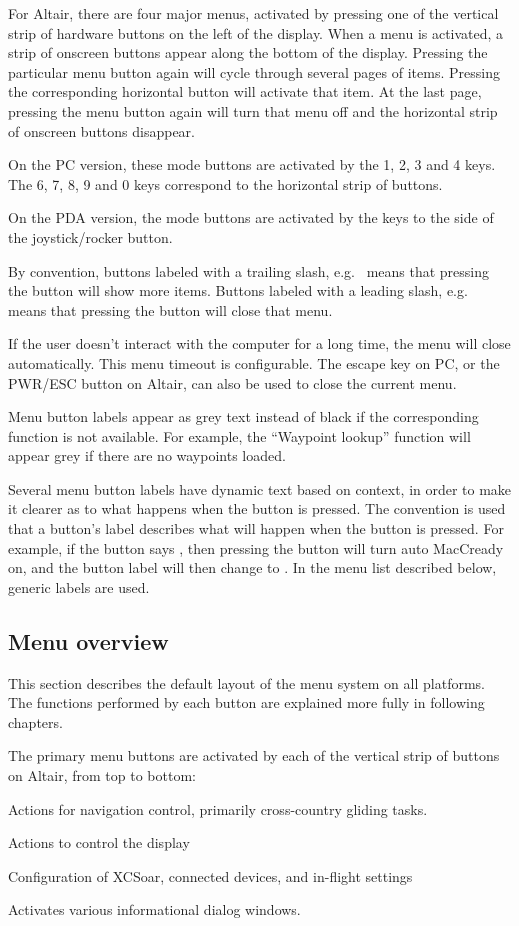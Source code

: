 \documentclass[a4paper,12pt]{refrep}
\begin{document}
For Altair, there are four major menus, activated by pressing one of
the vertical strip of hardware buttons on the left of the display.
When a menu is activated, a strip of onscreen buttons appear along the
bottom of the display.  Pressing the particular menu button again will
cycle through several pages of items.  Pressing the corresponding
horizontal button will activate that item.  At the last page, pressing
the menu button again will turn that menu off and the horizontal strip
of onscreen buttons disappear.  

On the PC version, these mode buttons are activated by the
1, 2, 3 and 4 keys.  The 6, 7, 8, 9 and 0 keys correspond to the horizontal
strip of buttons.

On the PDA version, the mode buttons are activated by the keys to the
side of the joystick/rocker button.

By convention, buttons labeled with a trailing slash,
e.g.~ means that pressing the button will show more items.
Buttons labeled with a leading slash, e.g.~ means that
pressing the button will close that menu.

If the user doesn't interact with the computer for a long time, the
menu will close automatically.  This menu timeout is configurable.
The escape key on PC, or the PWR/ESC button on Altair, can
also be used to close the current menu.

Menu button labels appear as grey text instead of black if the
corresponding function is not available.  For example, the ``Waypoint
lookup'' function will appear grey if there are no waypoints loaded.

Several menu button labels have dynamic text based on context, in
order to make it clearer as to what happens when the button is
pressed.  The convention is used that a button's label describes what
will happen when the button is pressed.  For example, if the button
says , then pressing the button will turn auto
MacCready on, and the button label will then change to .  In the menu list described below, generic labels are used.

\subsection*{Menu overview}
This section describes the default layout of the menu system on all
platforms.  The functions performed by each button are explained more
fully in following chapters.

The primary menu buttons are activated by each of the vertical strip of buttons
on Altair, from top to bottom:
\begin{jspecs}
\item[\bmenu{NAV}] Actions for navigation control, primarily cross-country
gliding tasks.
\item[\bmenu{DISPLAY}] Actions to control the display
\item[\bmenu{CONFIG}] Configuration of XCSoar, connected devices, and in-flight
settings
\item[\bmenu{INFO}] Activates various informational dialog windows.
\end{jspecs}
\end{document}

